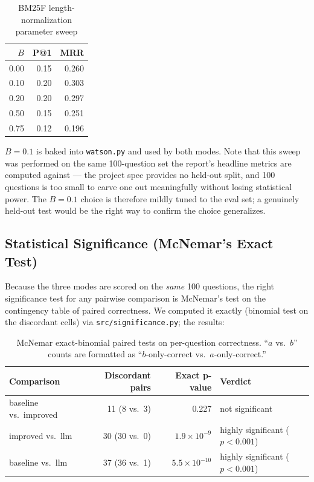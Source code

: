 \documentclass[11pt]{article}
\begin{document}
\begin{table}[h]
\centering
\begin{tabular}{rrr}
\toprule
$B$ & P@1 & MRR \\
\midrule
0.00 & 0.15 & 0.260 \\
0.10 & 0.20 & 0.303 \\
0.20 & 0.20 & 0.297 \\
0.50 & 0.15 & 0.251 \\
0.75 & 0.12 & 0.196 \\
\bottomrule
\end{tabular}
\caption{BM25F length-normalization parameter sweep}
\end{table}

$B = 0.1$ is baked into \texttt{watson.py} and used by both modes.
Note that this sweep was performed on the same 100-question set the
report's headline metrics are computed against --- the project spec
provides no held-out split, and 100 questions is too small to carve
one out meaningfully without losing statistical power. The
$B = 0.1$ choice is therefore mildly tuned to the eval set; a
genuinely held-out test would be the right way to confirm the choice
generalizes.

\subsection{Statistical Significance (McNemar's Exact Test)}

Because the three modes are scored on the \emph{same} 100 questions,
the right significance test for any pairwise comparison is McNemar's
test on the contingency table of paired correctness. We computed it
exactly (binomial test on the discordant cells) via
\texttt{src/significance.py}; the results:

\begin{table}[h]
\centering
\begin{tabular}{lrrl}
\toprule
\textbf{Comparison} & \textbf{Discordant pairs} & \textbf{Exact p-value} & \textbf{Verdict} \\
\midrule
baseline vs.\ improved & 11 (8 vs.\ 3) & 0.227    & not significant \\
improved vs.\ llm      & 30 (30 vs.\ 0) & $1.9 \times 10^{-9}$ & highly significant ($p<0.001$) \\
baseline vs.\ llm      & 37 (36 vs.\ 1) & $5.5 \times 10^{-10}$ & highly significant ($p<0.001$) \\
\bottomrule
\end{tabular}
\caption{McNemar exact-binomial paired tests on per-question
correctness. ``$a$ vs.\ $b$'' counts are formatted as
``$b$-only-correct vs.\ $a$-only-correct.''}
\end{table}
\end{document}

